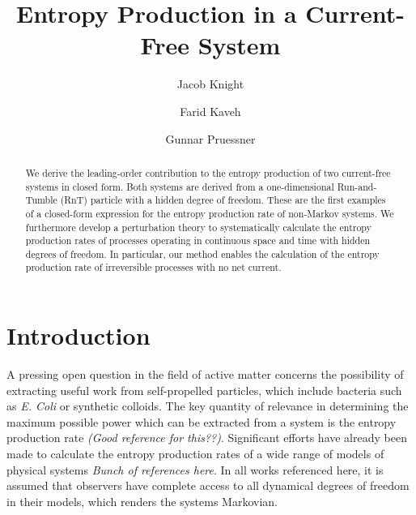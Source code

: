 \documentclass[%
 amsmath,amssymb,
]{revtex4-2}
\begin{document}
\title{Entropy Production in a Current-Free System}%

\author{Jacob Knight}

\author{Farid Kaveh}

\author{Gunnar Pruessner}%


%

\begin{abstract}

We derive the leading-order contribution to the entropy production of two current-free systems in closed form. Both systems are derived from a one-dimensional Run-and-Tumble (RnT) particle with a hidden degree of freedom. These are the first examples of a closed-form expression for the entropy production rate of non-Markov systems. We furthermore develop a perturbation theory to systematically calculate the entropy production rates of processes operating in continuous space and time with hidden degrees of freedom. In particular, our method enables the calculation of the entropy production rate of irreversible processes with no net current.
\end{abstract}

\maketitle

\section{Introduction}
A pressing open question in the field of active matter concerns the possibility of extracting useful work from self-propelled particles, which include bacteria such as \textit{E. Coli} or synthetic colloids. The key quantity of relevance in determining the maximum possible power which can be extracted from a system is the entropy production rate \textit{(Good reference for this??)}. Significant efforts have already been made to calculate the entropy production rates of a wide range of models of physical systems \textit{Bunch of references here}. In all works referenced here, it is assumed that observers have complete access to all dynamical degrees of freedom in their models, which renders the systems Markovian.
\end{document}
